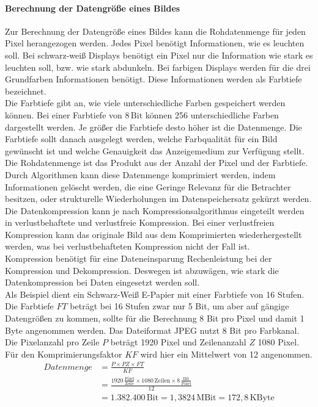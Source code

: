 \paragraph{Berechnung der Datengröße eines Bildes}
Zur Berechnung der Datengröße eines Bildes kann die Rohdatenmenge für jeden Pixel herangezogen werden. Jedes Pixel benötigt Informationen, wie es leuchten soll. Bei schwarz-weiß Displays benötigt ein Pixel nur die Information wie stark es leuchten soll, bzw. wie stark abdunkeln. Bei farbigen Displays werden für die drei Grundfarben Informationen benötigt. Diese Informationen werden als Farbtiefe bezeichnet. \\
Die Farbtiefe gibt an, wie viele unterschiedliche Farben gespeichert werden können. Bei einer Farbtiefe von $ 8\,\mathrm{Bit} $ können 256 unterschiedliche Farben dargestellt werden. Je größer die Farbtiefe desto höher ist die Datenmenge. Die Farbtiefe sollt danach ausgelegt werden, welche Farbqualität für ein Bild gewünscht ist und welche Genauigkeit das Anzeigemedium zur Verfügung stellt.
Die Rohdatenmenge ist das Produkt aus der Anzahl der Pixel und der Farbtiefe. \cite[Vgl. Seite 297 f.]{Stotz.2019}\\
Durch Algorithmen kann diese Datenmenge komprimiert werden, indem Informationen gelöscht werden, die eine Geringe Relevanz für die Betrachter besitzen, oder strukturelle Wiederholungen im Datenspeichersatz gekürzt werden. Die Datenkompression kann je nach Kompressionsalgorithmus eingeteilt werden in verlustbehaftete und verlustfreie Kompression. Bei einer verlustfreien Kompression kann das originale Bild aus dem Komprimierten wiederhergestellt werden, was bei verlustbehafteten Kompression nicht der Fall ist. \\
Kompression benötigt für eine Dateneinsparung Rechenleistung bei der Kompression und Dekompression. Deswegen ist abzuwägen, wie stark die Datenkompression bei Daten eingesetzt werden soll. \\
Als Beispiel dient ein Schwarz-Weiß E-Papier mit einer Farbtiefe von 16 Stufen. Die Farbtiefe $ FT $ beträgt bei 16 Stufen zwar nur 5 Bit, um aber auf gängige Datengrößen zu kommen, sollte für die Berechnung 8 Bit pro Pixel und damit 1 Byte angenommen werden. Das Dateiformat JPEG  nutzt 8 Bit pro Farbkanal. Die Pixelanzahl pro Zeile $ P $ beträgt 1920 Pixel und Zeilenanzahl $ Z $ 1080 Pixel. Für den Komprimierungsfaktor $ KF $ wird hier ein Mittelwert von 12 angenommen. \cite[Vgl. Seite 22]{Buhler.2018}
\begin{align}
		Datenmenge &= \frac{P \times PZ \times FT}{KF} \label{eq:Bilddatenmenge}\\
		&= \frac{1920\,\frac{\mathrm{Pixel}}{\mathrm{Zeile}}\times 1080\,\mathrm{Zeilen} \times 8\,\frac{\mathrm{Bit}}{\mathrm{Pixel}}}{12} \\
		&= 1.382.400\,\mathrm{Bit} = 1,3824\,\mathrm{MBit} = 172,8\,\mathrm{KByte}
\end{align}
